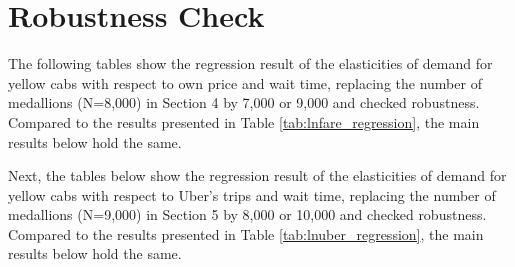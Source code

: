 \section{Robustness Check}
\hspace{0.5cm} 

The following tables show the regression result of the elasticities of demand for yellow cabs with respect to own price and wait time, replacing the number of medallions (N=8,000) in Section 4 by 7,000 or 9,000 and checked robustness. Compared to the results presented in Table \ref{tab:lnfare_regression}, the main results below hold the same.

\vspace{0.5cm}





\newpage

Next, the tables below show the regression result of the elasticities of demand for yellow cabs with respect to Uber's trips and wait time, replacing the number of medallions (N=9,000) in Section 5 by 8,000 or 10,000 and checked robustness. Compared to the results presented in Table \ref{tab:lnuber_regression}, the main results below hold the same.




